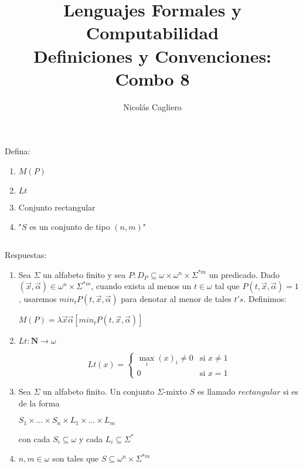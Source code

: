 \documentclass{article}
\title{Lenguajes Formales y Computabilidad \\
        \large Definiciones y Convenciones: Combo 8 }
\author{Nicolás Cagliero}
\begin{document}
\maketitle

Defina:

\begin{enumerate}
    \item $M(P)$

    \item $Lt$
    
    \item Conjunto rectangular
    
    \item "$S$ es un conjunto de tipo $(n, m)$"
\end{enumerate}

\(\)
\begin{center}
    Respuestas: 
    \(\)
\end{center}

\begin{enumerate}
    \item Sea $\Sigma$ un alfabeto finito y sea $P : D_P 
    \subseteq \omega \times \omega^{n} \times \Sigma^{*m}$ un predicado.
    Dado $(\overset{\rightarrow}{x}, \overset{\rightarrow}{\alpha})
    \in \omega^n \times \Sigma^{*m}$, cuando exista al menos un $t \in \omega$ tal que
    $P(t, \overset{\rightarrow}{x}, \overset{\rightarrow}{\alpha}) = 1$, 
    usaremos $min_t P(t, \overset{\rightarrow}{x}, \overset{\rightarrow}{\alpha})$ para
    denotar al menor de tales $t's$. Definimos:
    \begin{center}
        $M(P) = \lambda\overset{\rightarrow}{x} \overset{\rightarrow}{\alpha}
        [min_t P(t, \overset{\rightarrow}{x}, \overset{\rightarrow}{\alpha})]$
    \end{center}

    \item $Lt : \mathbf{N} \rightarrow \omega$
    \begin{center}
        \[
            Lt(x) =
            \begin{cases}
            \max_i (x)_i \neq 0 & \text{si } x \neq 1 \\
            0 & \text{si } x = 1
            \end{cases}
        \]
    \end{center}

    \item Sea $\Sigma$ un alfabeto finito. Un conjunto $\Sigma$-mixto $S$ es llamado
    $rectangular$ si es de la forma 
    \begin{center}
        $S_1 \times \dots \times S_n \times L_1 \times \dots \times L_m$
    \end{center}
    con cada $S_i \subseteq \omega$ y cada $L_i \subseteq \Sigma^{*}$

    \item $n, m \in \omega$ son tales que 
    $S \subseteq \omega^n \times \Sigma^{*m}$
\end{enumerate}
\end{document}

